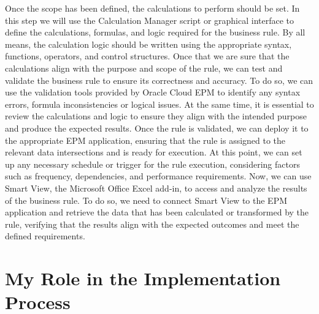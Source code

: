 \documentclass[12pt,a4paper,openright,twoside]{book}
\begin{document}
Once the scope has been defined, the calculations to perform should be set.
%
In this step we will use the Calculation Manager script or graphical interface to define the calculations, formulas, and logic required for the business rule. 
%
By all means, the calculation logic should be written using the appropriate syntax, functions, operators, and control structures.
%
Once that we are sure that the calculations align with the purpose and scope of the rule, we can test and validate the business rule to ensure its correctness and accuracy. 
%
To do so, we can use the validation tools provided by Oracle Cloud EPM to identify any syntax errors, formula inconsistencies or logical issues. 
%
At the same time, it is essential to review the calculations and logic to ensure they align with the intended purpose and produce the expected results.
%
Once the rule is validated, we can deploy it to the appropriate EPM application, ensuring that the rule is assigned to the relevant data intersections and is ready for execution. 
%
At this point, we can set up any necessary schedule or trigger for the rule execution, considering factors such as frequency, dependencies, and performance requirements.
%
Now, we can use Smart View, the Microsoft Office Excel add-in, to access and analyze the results of the business rule.
%
To do so, we need to connect Smart View to the EPM application and retrieve the data that has been calculated or transformed by the rule, verifying that the results align with the expected outcomes and meet the defined requirements.

\chapter{My Role in the Implementation Process}
\label{chap:cmyactivity}
\end{document}
